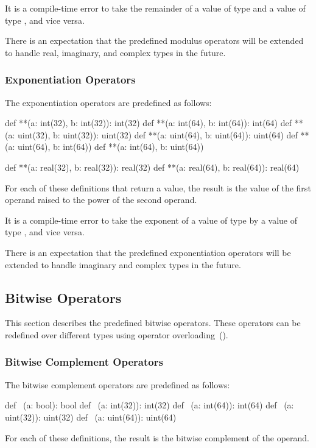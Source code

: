 It is a compile-time error to take the remainder of a value of
type  and a value of type , and vice
versa.

There is an expectation that the predefined modulus operators will be
extended to handle real, imaginary, and complex types in the future.

\subsubsection{Exponentiation Operators}
\label{Exponentiation_Operators}

The exponentiation operators are predefined as follows:
\begin{chapel}
def **(a: int(32), b: int(32)): int(32)
def **(a: int(64), b: int(64)): int(64)
def **(a: uint(32), b: uint(32)): uint(32)
def **(a: uint(64), b: uint(64)): uint(64)
def **(a: uint(64), b: int(64))
def **(a: int(64), b: uint(64))

def **(a: real(32), b: real(32)): real(32)
def **(a: real(64), b: real(64)): real(64)
\end{chapel}
For each of these definitions that return a value, the result is the
value of the first operand raised to the power of the second operand.

It is a compile-time error to take the exponent of a value of
type  by a value of type , and vice
versa.

There is an expectation that the predefined exponentiation operators
will be extended to handle imaginary and complex types in the future.

\subsection{Bitwise Operators}
\label{Bitwise_Operators}

This section describes the predefined bitwise operators.  These
operators can be redefined over different types using operator
overloading~().

\subsubsection{Bitwise Complement Operators}
\label{Bitwise_Complement_Operators}

The bitwise complement operators are predefined as follows:
\begin{chapel}
def ~(a: bool): bool
def ~(a: int(32)): int(32)
def ~(a: int(64)): int(64)
def ~(a: uint(32)): uint(32)
def ~(a: uint(64)): uint(64)
\end{chapel}
For each of these definitions, the result is the bitwise complement of
the operand.

